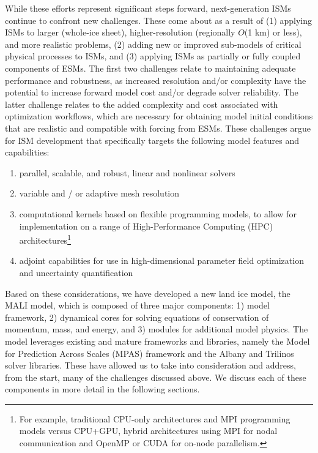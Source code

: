 While these efforts represent significant steps forward, next-generation ISMs continue to confront new challenges. These come about as a result of (1) applying ISMs to larger (whole-ice sheet), higher-resolution (regionally $O$(1 km) or less), and more realistic problems, (2) adding new or improved sub-models of critical physical processes to ISMs, and (3) applying ISMs as partially or fully coupled components of ESMs. The first two challenges relate to maintaining adequate performance and robustness, as increased resolution and/or complexity have the potential to increase forward model cost and/or degrade solver reliability. The latter challenge relates to the added complexity and cost associated with optimization workflows, which are necessary for obtaining model initial conditions that are realistic and compatible with forcing from ESMs. %
These challenges argue for ISM development that specifically targets the following model features and capabilities: 
\begin{enumerate}

\item parallel, scalable, and robust, linear and nonlinear solvers

\item variable and / or adaptive mesh resolution 

\item computational kernels based on flexible programming models, to allow for implementation on a range of High-Performance Computing (HPC) architectures\footnote{For example, traditional CPU-only architectures and MPI programming models versus CPU+GPU, hybrid architectures using MPI for nodal communication and OpenMP or CUDA for on-node parallelism.}

\item adjoint capabilities for use in high-dimensional parameter field optimization and uncertainty quantification 

\end{enumerate}

Based on these considerations, we have developed a new land ice model, the MALI model, which is composed of three major components: 
1) model framework, 2) dynamical cores for solving equations of conservation of momentum, mass, and energy, and 3) modules for additional model physics. The model leverages existing and mature frameworks and libraries, namely the Model for Prediction Across Scales (MPAS) framework and the Albany and Trilinos solver libraries. These have allowed us to take into consideration and address, from the start, many of the challenges discussed above. We discuss each of these components in more detail in the following sections.

